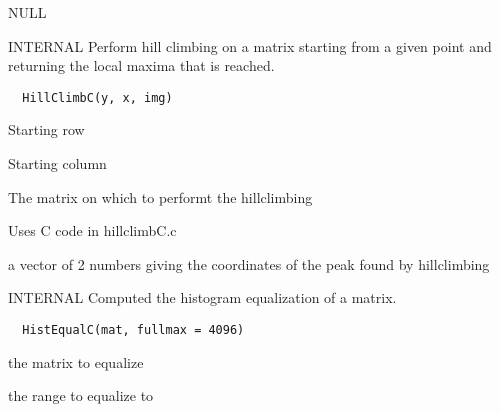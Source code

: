 \documentclass[a4paper]{book}
\begin{document}
%
\begin{Value}
NULL
\end{Value}
%
\begin{Description}\relax
INTERNAL Perform hill climbing on a matrix starting from
a given point and returning the local maxima that is
reached.
\end{Description}
%
\begin{Usage}
\begin{verbatim}
  HillClimbC(y, x, img)
\end{verbatim}
\end{Usage}
%
\begin{Arguments}
\begin{ldescription}
\item[\code{y}] Starting row

\item[\code{x}] Starting column

\item[\code{img}] The matrix on which to performt the
hillclimbing
\end{ldescription}
\end{Arguments}
%
\begin{Details}\relax
Uses C code in hillclimbC.c
\end{Details}
%
\begin{Value}
a vector of 2 numbers giving the coordinates of the peak
found by hillclimbing
\end{Value}
%
\begin{Description}\relax
INTERNAL Computed the histogram equalization of a matrix.
\end{Description}
%
\begin{Usage}
\begin{verbatim}
  HistEqualC(mat, fullmax = 4096)
\end{verbatim}
\end{Usage}
%
\begin{Arguments}
\begin{ldescription}
\item[\code{mat}] the matrix to equalize

\item[\code{fullmax}] the range to equalize to
\end{ldescription}
\end{Arguments}
\end{document}
